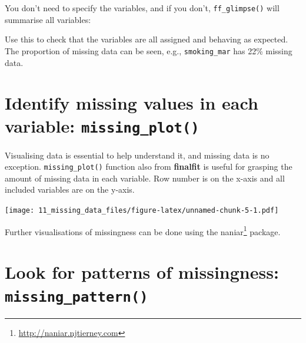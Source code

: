 \documentclass[
  12pt,
  krantz2]{krantz}
\makeatletter
\newenvironment{Shaded}{\begin{snugshade}}{\end{snugshade}}
\newcommand{\KeywordTok}[1]{\textcolor[rgb]{0.13,0.29,0.53}{\textbf{#1}}}
\newcommand{\NormalTok}[1]{#1}
\newcommand{\OperatorTok}[1]{\textcolor[rgb]{0.81,0.36,0.00}{\textbf{#1}}}
\newcommand{\StringTok}[1]{\textcolor[rgb]{0.31,0.60,0.02}{#1}}
\renewcommand{\href}[2]{#2\footnote{\url{#1}}}
\newenvironment{kframe}{%
\medskip{}
\setlength{\fboxsep}{.8em}
 \def\at@end@of@kframe{}%
 \ifinner\ifhmode%
  \def\at@end@of@kframe{\end{minipage}}%
  \begin{minipage}{\columnwidth}%
 \fi\fi%
 \def\FrameCommand##1{\hskip\@totalleftmargin \hskip-\fboxsep
 \colorbox{shadecolor}{##1}\hskip-\fboxsep
     \hskip-\linewidth \hskip-\@totalleftmargin \hskip\columnwidth}%
 \MakeFramed {\advance\hsize-\width
   \@totalleftmargin\z@ \linewidth\hsize
   \@setminipage}}%
 {\par\unskip\endMakeFramed%
 \at@end@of@kframe}
\renewenvironment{Shaded}{\begin{kframe}}{\end{kframe}}
\makeatother
\begin{document}
You don't need to specify the variables, and if you don't, \texttt{ff\_glimpse()} will summarise all variables:

\begin{Shaded}
\end{Shaded}

Use this to check that the variables are all assigned and behaving as expected.
The proportion of missing data can be seen, e.g., \texttt{smoking\_mar} has 22\% missing data.

\hypertarget{identify-missing-values-in-each-variable-missing_plot}{%
\section{\texorpdfstring{Identify missing values in each variable: \texttt{missing\_plot()}}{Identify missing values in each variable: missing\_plot()}}\label{identify-missing-values-in-each-variable-missing_plot}}


Visualising data is essential to help understand it, and missing data is no exception.
\texttt{missing\_plot()} function also from \textbf{finalfit} is useful for grasping the amount of missing data in each variable.
Row number is on the x-axis and all included variables are on the y-axis.

\begin{Shaded}
\end{Shaded}

\texttt{[image: 11\_missing\_data\_files/figure-latex/unnamed-chunk-5-1.pdf]}

Further visualisations of missingness can be done using the \href{http://naniar.njtierney.com}{naniar} package.

\hypertarget{look-for-patterns-of-missingness-missing_pattern}{%
\section{\texorpdfstring{Look for patterns of missingness: \texttt{missing\_pattern()}}{Look for patterns of missingness: missing\_pattern()}}\label{look-for-patterns-of-missingness-missing_pattern}}
\end{document}
